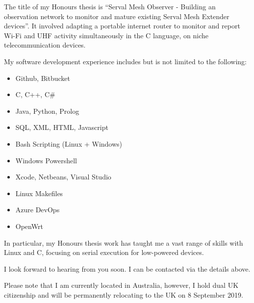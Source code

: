 \documentclass[11pt,a4paper]{moderncv}
\begin{document}
The title of my Honours thesis is ``Serval Mesh Observer - Building an observation network to monitor and mature existing Serval Mesh Extender devices''. It involved adapting a portable internet router to monitor and report Wi-Fi and UHF activity simultaneously in the C language, on niche telecommunication devices.

My software development experience includes but is not limited to the following:

\begin{multicols}{2}
\begin{itemize}
    \item Github, Bitbucket
    \item C, C++, C\#
    \item Java, Python, Prolog
    \item SQL, XML, HTML, Javascript
    \item Bash Scripting (Linux + Windows)
    \item Windows Powershell
    \item Xcode, Netbeans, Visual Studio
    \item Linux Makefiles
    \item Azure DevOps
    \item OpenWrt
\end{itemize}
\end{multicols}

In particular, my Honours thesis work has taught me a vast range of skills with Linux and C, focusing on serial execution for low-powered devices.

I look forward to hearing from you soon. I can be contacted via the details above.

Please note that I am currently located in Australia, however, I hold dual UK citizenship and will be permanently relocating to the UK on 8 September 2019.


\makeletterclosing
\end{document}
